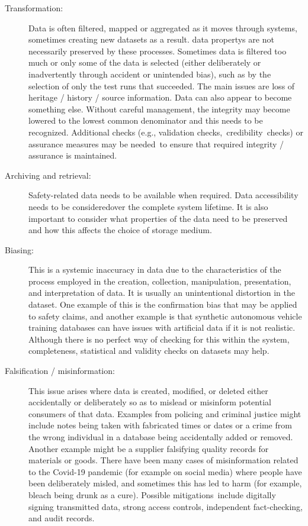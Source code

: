 \begin{description}
\item[Transformation:] Data is often filtered, mapped or aggregated as it moves through systems, sometimes creating new \glspl{dataset} as a result. \Glspl{data property} are not necessarily preserved by these processes. Sometimes data is filtered too much or only some of the data is selected (either deliberately or inadvertently through accident or unintended bias), such as by the selection of only the test runs that succeeded. The main issues are loss of heritage / history / source \gls{information}. Data can also appear to become something else. Without careful management, the \gls{integrity} may become lowered to the lowest common denominator and this needs to be recognized. Additional checks (e.g., \gls{validation} checks,\cbstart\ credibility\cbend\ checks) or assurance measures may \cbstart be needed\cbend\ to ensure that required \gls{integrity} / assurance is maintained.

\item[Archiving and retrieval:] Safety-related data needs to be available when required. \cbstart Data accessibility needs to be considered\cbend over the complete system lifetime. It is also important to consider what properties of the data need to be preserved and how this affects the choice of storage medium.

\item[Biasing:] This is a systemic inaccuracy in data due to the characteristics of the process employed in the creation, collection, manipulation, presentation, and interpretation of data. It is usually an unintentional distortion in the \gls{dataset}. One example of this is the confirmation bias that may be applied to safety claims, and another example is that synthetic autonomous vehicle training \glspl{database} can have issues with artificial data if it is not realistic.
Although there is no perfect way of checking for this within the system, \gls{completeness}, statistical and validity checks on \glspl{dataset} may help.

\item[Falsification / misinformation:] This issue arises where data is created, modified, or deleted either accidentally or deliberately so as to mislead or misinform potential consumers of that data. Examples from policing and criminal justice might \cbstart include notes being taken with fabricated times or dates or a crime from the wrong individual in a \gls{database} being accidentally added or removed\cbend. Another example might be a supplier falsifying quality records for materials or goods. There have been many cases of misinformation related to the Covid-19 pandemic (for example on social media) where people have been deliberately misled, and sometimes this has led to harm (\cbstart for example, bleach being drunk as a cure\cbend). \cbstart Possible \glspl{mitigation}\cbend\ include digitally signing transmitted data, strong access controls, independent fact-checking, and audit records.


\end{description}
